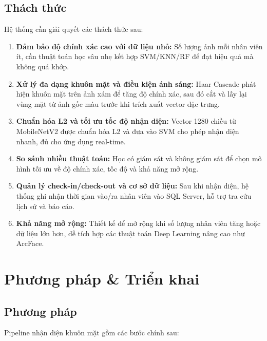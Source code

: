 \documentclass[a4paper]{book}
\begin{document}
\section{Thách thức}
Hệ thống cần giải quyết các thách thức sau:
\begin{enumerate}
    \item \textbf{Đảm bảo độ chính xác cao với dữ liệu nhỏ:} Số lượng ảnh mỗi nhân viên ít, cần thuật toán học sâu nhẹ kết hợp SVM/KNN/RF để đạt hiệu quả mà không quá khớp.
    \item \textbf{Xử lý đa dạng khuôn mặt và điều kiện ánh sáng:} Haar Cascade phát hiện khuôn mặt trên ảnh xám để tăng độ chính xác, sau đó cắt và lấy lại vùng mặt từ ảnh gốc màu trước khi trích xuất vector đặc trưng.
    \item \textbf{Chuẩn hóa L2 và tối ưu tốc độ nhận diện:} Vector 1280 chiều từ MobileNetV2 được chuẩn hóa L2 và đưa vào SVM cho phép nhận diện nhanh, đủ cho ứng dụng real-time.
    \item \textbf{So sánh nhiều thuật toán:} Học có giám sát và không giám sát để chọn mô hình tối ưu về độ chính xác, tốc độ và khả năng mở rộng.
    \item \textbf{Quản lý check-in/check-out và cơ sở dữ liệu:} Sau khi nhận diện, hệ thống ghi nhận thời gian vào/ra nhân viên vào SQL Server, hỗ trợ tra cứu lịch sử và báo cáo.
    \item \textbf{Khả năng mở rộng:} Thiết kế để mở rộng khi số lượng nhân viên tăng hoặc dữ liệu lớn hơn, dễ tích hợp các thuật toán Deep Learning nâng cao như ArcFace.
\end{enumerate}


\chapter{Phương pháp \& Triển khai}

\section{Phương pháp}
Pipeline nhận diện khuôn mặt gồm các bước chính sau:
\end{document}
